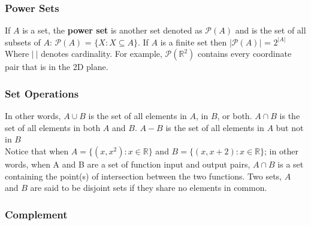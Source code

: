 \documentclass[12pt]{report}
\begin{document}
\subsubsection{Power Sets}

\hspace{\parindent}If $A$ is a set, the \textbf{power set} is another set denoted as $\mathscr{P}(A)$ and is the set of all subsets of $A$: $\mathscr{P}(A)$ = $\{X: X \subseteq A\}$. If $A$ is a finite set then $|\mathscr{P}(A)|$ = $2^{|A|}$ Where $|~|$ denotes cardinality. For example, $\mathscr{P}(\mathbb{R}^{2})$ contains every coordinate pair that is in the 2D plane.

\subsubsection{Set Operations}

\bigskip

In other words, $A \cup B$ is the set of all elements in $A$, in $B$, or both. $A \cap B$ is the set of all elements in both $A$ and $B$. $A - B$ is the set of all elements in $A$ but not in $B$\vspace{5pt}\\
Notice that when $A=\{(x, x^{2}):x \in \mathbb{R}\}$ and $B=\{(x, x+2):x \in \mathbb{R}\}$; in other words, when A and B are a set of function input and output pairs, $A \cap B$ is a set containing the point(s) of intersection between the two functions.
Two sets, $A$ and $B$ are said to be disjoint sets if they share no elements in common.

\subsubsection{Complement}
\end{document}
